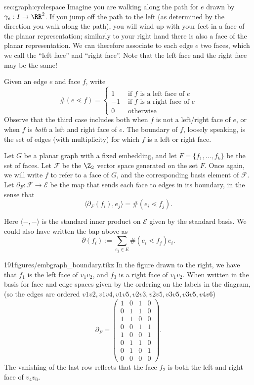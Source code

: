 \begin{stationconnection}{sec:graph:cyclespace}
 Imagine you are walking along the path for $e$ drawn by $\gamma_e: I\to \RR^2$. If you jump off the path to the left (as determined by the direction you walk along the path), you will wind up with your feet in a face of the planar representation; similarly to your right hand there is also a face of the planar representation. We can therefore associate to each edge $e$ two faces, which we call the ``left face'' and ``right face''.  Note that the left face and the right face may be the same! 

 Given an edge $e$ and face $f$, write 
\[
  \#(e\lessdot f)=\left\{\begin{array}{cc}\\
    1 & \text{ if $f$ is a left face of $e$}\\
    -1 & \text{ if $f$ is a right face of $e$}\\
    0 & \text{ otherwise}\end{array}\right.
\]
Observe that the third case includes both when $f$ is not a left/right face of $e$, or when $f$ is \emph{both} a left and right face of $e$. 
The boundary of $f$, loosely speaking, is the set of edges (with multiplicity) for which $f$ is a left or right face. 
\begin{definition} Let $G$ be a planar graph with a fixed embedding, and let $F=\{f_1, \ldots, f_k\}$ be the set of faces. Let $\mathcal F$ be the $\Z_2$ vector space generated on the set $F$. Once again, we will write $f$ to refer to a face of $G$, and the corresponding basis element of $\mathcal F$. Let $\partial_F: \mathcal F\to \mathcal E$ be the map that sends each face to edges in its boundary, in the sense that  
  \[\langle \partial_F(f_i), e_j\rangle = \#(e_i\lessdot f_j).\]  
 \end{definition}
 Here $\langle - , - \rangle$ is the standard inner product on $\mathcal E$ given by the standard basis. We could also have written the bap above as 
 \[\partial(f_i):= \sum_{e_j\in E} \#(e_i \lessdot f_j) e_i.\]
 
\begin{examplefigureenv}{191figures/embgraph_boundary.tikz}	
  In the figure drawn to the right, we have that $f_1$ is the left face of $v_1v_2$, and $f_3$ is a right face of $v_1v_2$.  When written in the basis for face and edge spaces given by the ordering on the labels in the diagram,(so the edges are ordered $v1v2, v1v4, v1v5,v2v3,v2v5,v3v5,v3v5,v4v6$)
  \[
    \partial_F=\begin{pmatrix} 
      1&0&1&0\\
      0&1&1&0\\
      1&1&0&0\\
      0&0&1&1\\
      1&0&0&1\\
      0&1&1&0\\
      0&1&0&1\\
      0&0&0&0
    \end{pmatrix}.
  \]
  The vanishing of the last row reflects that the face $f_2$ is both the left and right face of $v_4v_6$.
\end{examplefigureenv}



\end{stationconnection}
